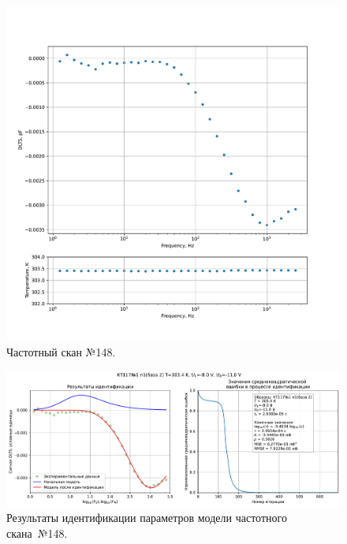 \begin{figure}[!ht]
    \centering
    \includegraphics[width=1\textwidth]{../plots/КТ117№1_п1(база 2)_2500Гц-1Гц_1пФ_+30С_-8В-11В_50мВ_20мкс_шаг_0,1.pdf}
    \caption{Частотный скан №148.}
    \label{pic:frequency_scan_148}
\end{figure}

\begin{figure}[!ht]
    \centering
    \includegraphics[width=1\textwidth]{../plots/КТ117№1_п1(база 2)_2500Гц-1Гц_1пФ_+30С_-8В-11В_50мВ_20мкс_шаг_0,1_model.pdf}
    \caption{Результаты идентификации параметров модели частотного скана~№148.}
    \label{pic:frequency_scan_model148}
\end{figure}

\pagebreak


